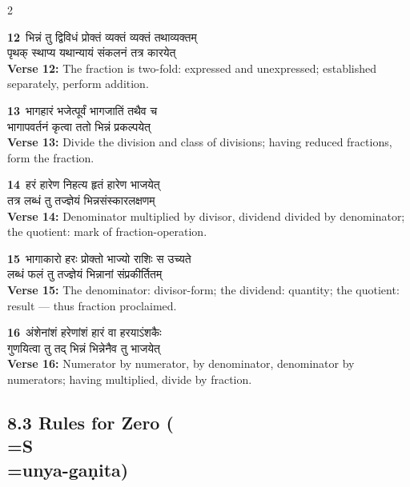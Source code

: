 \documentclass[11pt,a4paper]{article}
\newcommand{\dev}[1]{{\devanagarifont #1}}
\newcommand{\vnum}[1]{\textcolor{versenumbercolor}{\textbf{#1}}}
\begin{document}
\begin{paracol}{2}

\switchcolumn[0]
\vnum{12}\ \dev{भिन्नं तु द्विविधं प्रोक्तं व्यक्तं व्यक्तं तथाव्यक्तम्}\\
\dev{पृथक् स्थाप्य यथान्यायं संकलनं तत्र कारयेत्}\\
\switchcolumn[1]
\textbf{Verse 12:} The fraction is two-fold: expressed and unexpressed; established separately, perform addition.

\switchcolumn[0]
\vnum{13}\ \dev{भागहारं भजेत्पूर्वं भागजातिं तथैव च}\\
\dev{भागापवर्तनं कृत्वा ततो भिन्नं प्रकल्पयेत्}\\
\switchcolumn[1]
\textbf{Verse 13:} Divide the division and class of divisions; having reduced fractions, form the fraction.

\switchcolumn[0]
\vnum{14}\ \dev{हरं हारेण निहत्य हृतं हारेण भाजयेत्}\\
\dev{तत्र लब्धं तु तज्ज्ञेयं भिन्नसंस्कारलक्षणम्}\\
\switchcolumn[1]
\textbf{Verse 14:} Denominator multiplied by divisor, dividend divided by denominator; the quotient: mark of fraction-operation.

\switchcolumn[0]
\vnum{15}\ \dev{भागाकारो हरः प्रोक्तो भाज्यो राशिः स उच्यते}\\
\dev{लब्धं फलं तु तज्ज्ञेयं भिन्नानां संप्रकीर्तितम्}\\
\switchcolumn[1]
\textbf{Verse 15:} The denominator: divisor-form; the dividend: quantity; the quotient: result --- thus fraction proclaimed.

\switchcolumn[0]
\vnum{16}\ \dev{अंशेनांशं हरेणांशं हारं वा हरयाऽंशकैः}\\
\dev{गुणयित्वा तु तद् भिन्नं भिन्नेनैव तु भाजयेत्}\\
\switchcolumn[1]
\textbf{Verse 16:} Numerator by numerator, by denominator, denominator by numerators; having multiplied, divide by fraction.

\end{paracol}

\subsection*{8.3 Rules for Zero (\\=S\\=unya-ga\d nita)}
\label{sec:8.3}

\begin{center}
\end{center}
\end{document}
